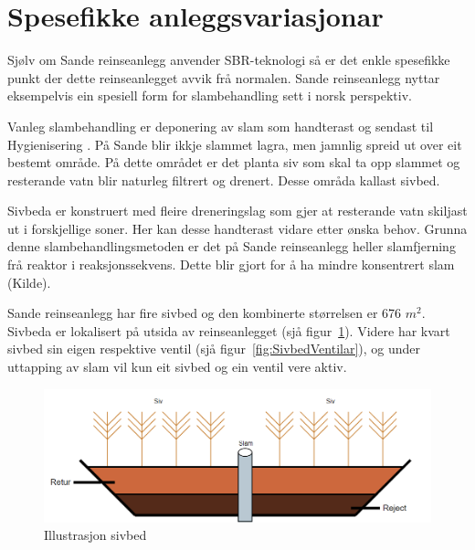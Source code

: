 \newpage
\section{Spesefikke anleggsvariasjonar}
\thispagestyle{fancy}

Sjølv om Sande reinseanlegg anvender \gls{SBR}-teknologi så er det enkle spesefikke
punkt der dette reinseanlegget avvik frå normalen. 
Sande reinseanlegg nyttar eksempelvis ein spesiell form for slambehandling sett i norsk perspektiv.

Vanleg slambehandling er deponering av slam som handterast og sendast til \gls{Hygienisering} \citep{Slam}.
På Sande blir ikkje slammet lagra, men jamnlig spreid ut over eit bestemt område. På dette området er
det planta siv som skal ta opp slammet og resterande vatn blir naturleg filtrert og drenert.
Desse områda kallast sivbed.

Sivbeda er konstruert med fleire dreneringslag som gjer at resterande vatn skiljast ut i forskjellige soner.
Her kan desse handterast vidare etter ønska behov. 
Grunna denne slambehandlingsmetoden er det på Sande reinseanlegg heller slamfjerning frå reaktor
i reaksjonssekvens. Dette blir gjort for å ha mindre konsentrert slam (Kilde). %

Sande reinseanlegg har fire sivbed og den kombinerte størrelsen er 676 $m^2$. Sivbeda er lokalisert på utsida av reinseanlegget (sjå figur~\ref{fig:Sivbed}).\newline
Videre har kvart sivbed sin eigen respektive ventil (sjå figur~\ref{fig:SivbedVentilar}), og under uttapping av slam vil kun eit sivbed og ein ventil vere aktiv. 
 

\begin{figure}[htbp]
    \centering
    \includegraphics[width=1\textwidth]{Figurar/Sivbed.png}
    \caption{Illustrasjon sivbed}\label{fig:Sivbed}
\end{figure}

\newpage

